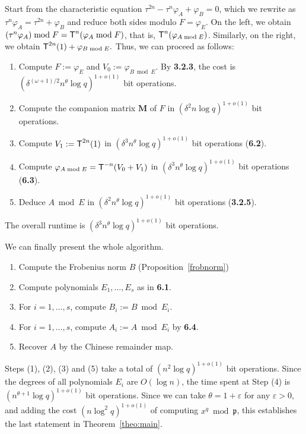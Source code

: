 \documentclass[sigconf]{acmart}
\newcommand{\frakp}{\mathfrak{p}}
\begin{document}
Start from the characteristic equation $\tau^{2n} - \tau^n \varphi_A +
\varphi_B=0$, which we rewrite as $\tau^n \varphi_A = \tau^{2n} +
\varphi_B$ and reduce both sides modulo $F=\varphi_E$. On the left, we
obtain $(\tau^n \varphi_A) \bmod F = \text{\sf T}^n(\varphi_A \bmod
F)$, that is, $\text{\sf T}^n(\varphi_{A \bmod E})$. Similarly, on the
right, we obtain $\text{\sf T}^{2n}(1) + \varphi_{B \bmod E}.$ Thus, we can
proceed as follows:
\begin{enumerate}
\item Compute $F:=\varphi_E$ and $V_0:=\varphi_{B \bmod E}$. By
  {\bf 3.2.3}, the cost is
  $(\delta^{(\omega+1)/2} n^\theta \log q)^{1+o(1)}$ bit operations.
\item Compute the companion matrix ${\bm M}$ of $F$ in 
  $(\delta^2 n \log q)^{1+o(1)}$ bit operations.
\item Compute $V_1:=\text{\sf T}^{2n}(1)$ in $(\delta^3 n^\theta \log
  q)^{1+o(1)}$ bit operations ({\bf 6.2}).
\item Compute $\varphi_{A \bmod E}=\text{\sf T}^{-n}(V_0+V_1)$ in $(\delta^3
  n^\theta \log q)^{1+o(1)}$ bit operations ({\bf 6.3}).
\item Deduce $A \bmod E$ in $(\delta^2 n^\theta \log q)^{1+o(1)}$ bit
  operations ({\bf 3.2.5}).
\end{enumerate}
The overall runtime is $(\delta^3 n^\theta \log q)^{1+o(1)}$ bit
operations.

\smallskip{} We can finally present the
whole algorithm. 
\begin{enumerate}
\item Compute the Frobenius norm $B$ (Proposition~\ref{frobnorm})
\item Compute polynomials $E_1,\dots,E_s$ as in {\bf 6.1}.
\item For $i=1,\dots,s$, compute $B_i:=B \bmod E_i$.
\item For $i=1,\dots,s$, compute $A_i:=A \bmod E_i$ by {\bf 6.4}.
\item Recover $A$ by the Chinese remainder map.
\end{enumerate}
Steps (1), (2), (3) and (5) take a total of $(n^2 \log q)^{1+o(1)}$
bit operations. Since the degrees of all polynomials $E_i$ are $O(\log
n)$, the time spent at Step (4) is $(n^{\theta+1} \log
q)^{1+o(1)}$ bit operations. Since we can take $\theta = 1+\varepsilon$ 
for any $\varepsilon > 0$, and adding the cost
$(n \log^2 q)^{1+o(1)}$
 of computing $x^q \bmod \frakp$, 
this establishes the last statement in Theorem~\ref{theo:main}.
\end{document}
